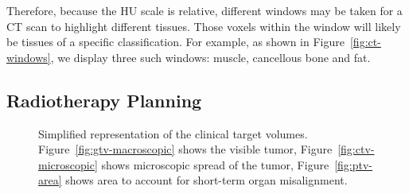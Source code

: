 \documentclass[12pt,twoside]{report}
\begin{document}
Therefore, because the HU scale is relative, different windows may be taken for a CT scan to highlight different tissues. Those voxels within the window will likely be tissues of a specific classification. For example, as shown in Figure~\ref{fig:ct-windows}, we display three such windows: muscle, cancellous bone and fat.

\subsection{Radiotherapy Planning}\label{sect:radiotherapy-planning}

\begin{figure}[H]
  \caption{Simplified representation of the clinical target volumes. Figure~\ref{fig:gtv-macroscopic} shows the visible tumor, Figure~\ref{fig:ctv-microscopic} shows microscopic spread of the tumor, Figure~\ref{fig:ptv-area} shows area to account for short-term organ misalignment.}\label{fig:planning-areas}
\end{figure}
\end{document}
